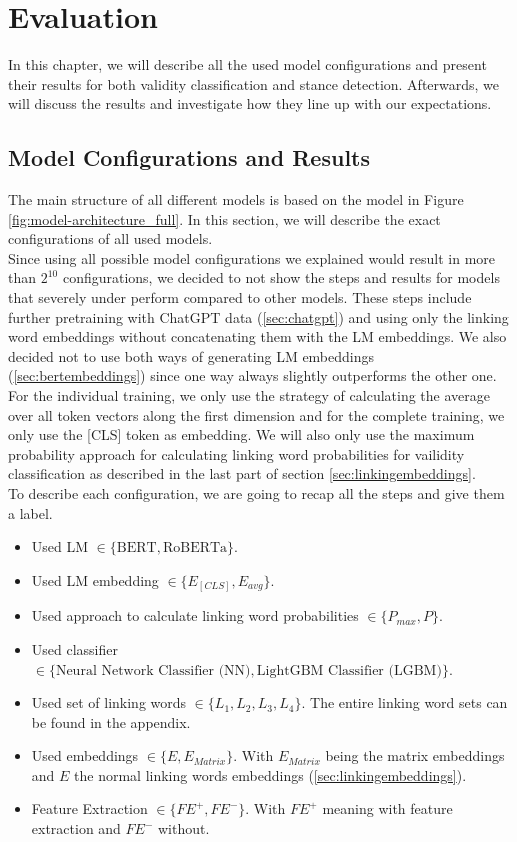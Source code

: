 \section{Evaluation}

In this chapter, we will describe all the used model configurations and present their results for both validity classification and stance detection. Afterwards, we will discuss the results and investigate how they line up with our expectations.

\subsection{Model Configurations and Results}

The main structure of all different models is based on the model in Figure \ref{fig:model-architecture_full}. In this section, we will describe the exact configurations of all used models. \\
Since using all possible model configurations we explained would result in more than $2^{10}$ configurations, we decided to not show the steps and results for models that severely under perform compared to other models. These steps include further pretraining with ChatGPT data (\ref{sec:chatgpt}) and using only the linking word embeddings without concatenating them with the LM embeddings. We also decided not to use both ways of generating LM embeddings (\ref{sec:bertembeddings}) since one way always slightly outperforms the other one. For the individual training, we only use the strategy of calculating the average over all token vectors along the first dimension and for the complete training, we only use the [CLS] token as embedding. We will also only use the maximum probability approach for calculating linking word probabilities for vailidity classification as described in the last part of section \ref{sec:linkingembeddings}.  \\
To describe each configuration, we are going to recap all the steps and give them a label.
\begin{itemize}
	\item Used LM $\in \{\text{BERT}, \text{RoBERTa}\}$.
	\item Used LM embedding $\in \{E_{[CLS]}, E_{avg}\}$.
	\item Used approach to calculate linking word probabilities $\in \{P_{max}, P\}$.
	\item Used classifier $\in \{\text{Neural Network Classifier (NN)}, \text{LightGBM Classifier (LGBM)}\}$.
	\item Used set of linking words $\in \{L_1, L_2, L_3, L_4\}$. The entire linking word sets can be found in the appendix.
	\item Used embeddings $\in \{E, E_{Matrix}\}$. With $E_{Matrix}$ being the matrix embeddings and $E$ the normal linking words embeddings (\ref{sec:linkingembeddings}).
	\item Feature Extraction $\in \{\textit{FE}^+, \textit{FE}^-\}$. With $\textit{FE}^+$ meaning with feature extraction and $\textit{FE}^-$ without.
\end{itemize}
